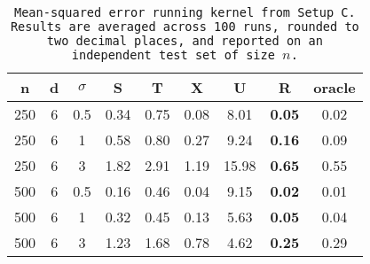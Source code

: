 \begin{table}[ht]
\centering
\begin{tabular}{ccccccccc}
  \hline
n & d & $\sigma$ & S & T & X & U & R & oracle \\ 
  \hline
250 & 6 & 0.5 & 0.34 & 0.75 & 0.08 &  8.01 & \bf 0.05 & 0.02 \\ 
  250 & 6 & 1 & 0.58 & 0.80 & 0.27 &  9.24 & \bf 0.16 & 0.09 \\ 
  250 & 6 & 3 & 1.82 & 2.91 & 1.19 & 15.98 & \bf 0.65 & 0.55 \\ 
  500 & 6 & 0.5 & 0.16 & 0.46 & 0.04 &  9.15 & \bf 0.02 & 0.01 \\ 
  500 & 6 & 1 & 0.32 & 0.45 & 0.13 &  5.63 & \bf 0.05 & 0.04 \\ 
  500 & 6 & 3 & 1.23 & 1.68 & 0.78 &  4.62 & \bf 0.25 & 0.29 \\ 
   \hline
\end{tabular}
\caption{\tt Mean-squared error running \texttt{kernel} from Setup C. Results are averaged across 100 runs, rounded to two decimal places, and reported on an independent test set of size $n$.} 
\label{table:setup3}
\end{table}
